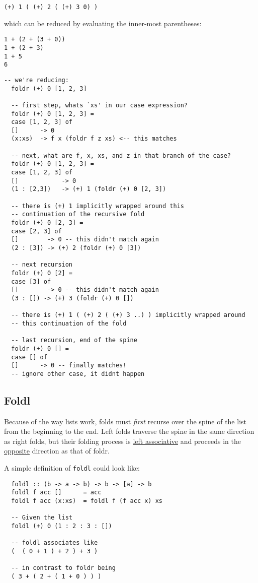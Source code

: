 \begin{verbatim}
(+) 1 ( (+) 2 ( (+) 3 0) )
\end{verbatim}

which can be reduced by evaluating the inner-most parentheses:
\begin{verbatim}
1 + (2 + (3 + 0))
1 + (2 + 3)
1 + 5
6
\end{verbatim}
 
\begin{lstlisting}[linewidth=15cm]
  -- we're reducing:
  foldr (+) 0 [1, 2, 3]

  -- first step, whats `xs' in our case expression?
  foldr (+) 0 [1, 2, 3] =
  case [1, 2, 3] of 
  []      -> 0
  (x:xs)  -> f x (foldr f z xs) <-- this matches

  -- next, what are f, x, xs, and z in that branch of the case?
  foldr (+) 0 [1, 2, 3] =
  case [1, 2, 3] of
  []            -> 0
  (1 : [2,3])   -> (+) 1 (foldr (+) 0 [2, 3])

  -- there is (+) 1 implicitly wrapped around this
  -- continuation of the recursive fold
  foldr (+) 0 [2, 3] =
  case [2, 3] of
  []        -> 0 -- this didn't match again
  (2 : [3]) -> (+) 2 (foldr (+) 0 [3])

  -- next recursion
  foldr (+) 0 [2] =
  case [3] of
  []        -> 0 -- this didn't match again
  (3 : []) -> (+) 3 (foldr (+) 0 [])
  
  -- there is (+) 1 ( (+) 2 ( (+) 3 ..) ) implicitly wrapped around
  -- this continuation of the fold

  -- last recursion, end of the spine
  foldr (+) 0 [] =
  case [] of
  []      -> 0 -- finally matches!
  -- ignore other case, it didnt happen
\end{lstlisting}

\subsection{Foldl}
Because of the way lists work, folds must \emph{first} recurse over the spine of the list from the beginning to the end. Left folds traverse the spine in the same direction as right folds, but their folding process is \underline{left associative} and proceeds in the \underline{opposite} direction as that of foldr.

A simple definition of \texttt{foldl} could look like:
\begin{lstlisting}
  foldl :: (b -> a -> b) -> b -> [a] -> b
  foldl f acc []      = acc
  foldl f acc (x:xs)  = foldl f (f acc x) xs

  -- Given the list
  foldl (+) 0 (1 : 2 : 3 : [])

  -- foldl associates like
  (  ( 0 + 1 ) + 2 ) + 3 )

  -- in contrast to foldr being
  ( 3 + ( 2 + ( 1 + 0 ) ) )
\end{lstlisting}

